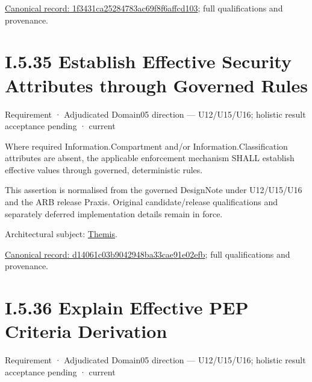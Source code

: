{\footnotesize \href{../../../../continuum/motivation/requirement/1f3431ca25284783ac69f8f6affcd103.md}{Canonical record: 1f3431ca25284783ac69f8f6affcd103}; full qualifications and provenance.}\par
\section*{I.5.35 Establish Effective Security Attributes through Governed Rules}
\label{navigation:I.5.35}

\label{element:d14061c03b9042948ba33cae91e02efb}
{\small Requirement · Adjudicated Domain05 direction — U12/U15/U16; holistic result acceptance pending · current}\par

Where required Information.Compartment and/or Information.Classification attributes are absent, the applicable enforcement mechanism SHALL establish effective values through governed, deterministic rules.



This assertion is normalised from the governed DesignNote under U12/U15/U16 and the ARB release Praxis. Original candidate/release qualifications and separately deferred implementation details remain in force.



Architectural subject: \hyperref[element:899d34ec491948b68aad09e507dea6d1]{Themis}.


{\footnotesize \href{../../../../continuum/motivation/requirement/d14061c03b9042948ba33cae91e02efb.md}{Canonical record: d14061c03b9042948ba33cae91e02efb}; full qualifications and provenance.}\par
\section*{I.5.36 Explain Effective PEP Criteria Derivation}
\label{navigation:I.5.36}

\label{element:f027de050273400eaac0de083b820238}
{\small Requirement · Adjudicated Domain05 direction — U12/U15/U16; holistic result acceptance pending · current}\par

